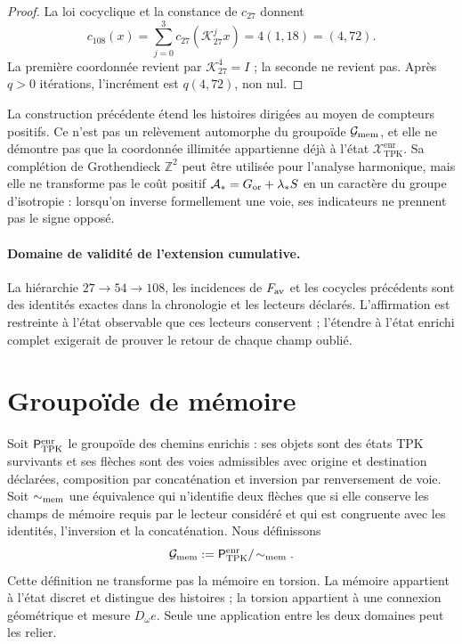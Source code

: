 \begin{proof}
La loi cocyclique et la constance de \(c_{27}\) donnent
\[
 c_{108}(x)
 =\sum_{j=0}^{3}c_{27}(\mathcal K_{27}^{j}x)
 =4(1,18)=(4,72).
\]
La première coordonnée revient par
\(\mathcal K_{27}^{4}=I\) ; la seconde ne revient pas. Après \(q>0\) itérations,
l'incrément est \(q(4,72)\), non nul.
\end{proof}

\begin{remark}
La construction précédente étend les histoires dirigées au moyen de compteurs
positifs. Ce n'est pas un relèvement automorphe du groupoïde
\(\mathcal G_{\rm mem}\), et elle ne démontre pas que la coordonnée illimitée appartienne
déjà à l'état \(\mathcal X_{\mathrm{TPK}}^{\mathrm{enr}}\). Sa complétion de Grothendieck
\(\mathbb Z^2\) peut être utilisée pour l'analyse harmonique, mais elle ne transforme pas
le coût positif
\(\mathcal A_\ast=G_{\rm or}+\lambda_\ast S\) en un caractère du groupe
d'isotropie : lorsqu'on inverse formellement une voie, ses indicateurs ne prennent pas
le signe opposé.
\end{remark}

\paragraph{Domaine de validité de l'extension cumulative.}
La hiérarchie \(27\to54\to108\), les incidences de \(F_{\rm av}\) et les
cocycles précédents sont des identités exactes dans la chronologie et les
lecteurs déclarés. L'affirmation est restreinte à l'état observable que
ces lecteurs conservent ; l'étendre à l'état enrichi complet exigerait
de prouver le retour de chaque champ oublié.

\section{Groupoïde de mémoire}
\label{sec:grupoide-memoria-tpk}

Soit \(\mathsf P_{\rm TPK}^{\rm enr}\) le groupoïde des chemins enrichis :
ses objets sont des états TPK survivants et ses flèches sont des voies admissibles
avec origine et destination déclarées, composition par concaténation et inversion
par renversement de voie. Soit \(\sim_{\rm mem}\) une équivalence qui
n'identifie deux flèches que si elle conserve les champs de mémoire requis par
le lecteur considéré et qui est congruente avec les identités, l'inversion et la
concaténation. Nous définissons
\[
 \mathcal G_{\rm mem}
 :=\mathsf P_{\rm TPK}^{\rm enr}/\!\sim_{\rm mem}.
\]
Cette définition ne transforme pas la mémoire en torsion. La mémoire appartient à
l'état discret et distingue des histoires ; la torsion appartient à une connexion
géométrique et mesure \(D_\omega e\). Seule une application entre les deux domaines peut
les relier.

